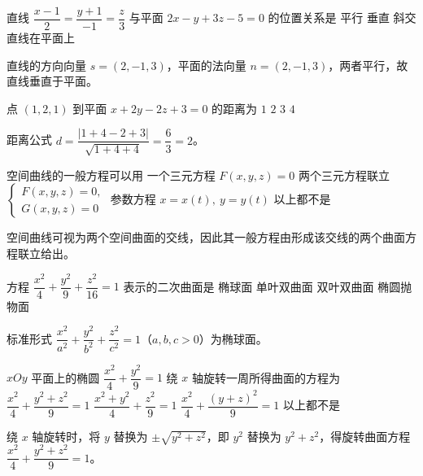 \documentclass[answer]{THUExam}
\begin{document}
\begin{problem}
直线 $\dfrac{x-1}{2}=\dfrac{y+1}{-1}=\dfrac{z}{3}$ 与平面 $2x-y+3z-5=0$ 的位置关系是
\options
{平行}
{垂直}
{斜交}
{直线在平面上}
\end{problem}
\begin{note}
直线的方向向量 $s=(2,-1,3)$，平面的法向量 $n=(2,-1,3)$，两者平行，故直线垂直于平面。
\end{note}
\bigskip

\begin{problem}
点 $(1,2,1)$ 到平面 $x+2y-2z+3=0$ 的距离为
\options
{$1$}
{$2$}
{$3$}
{$4$}
\end{problem}
\begin{note}
距离公式 $d=\dfrac{|1+4-2+3|}{\sqrt{1+4+4}}=\dfrac{6}{3}=2$。
\end{note}
\bigskip

\begin{problem}
空间曲线的一般方程可以用
\options
{一个三元方程 $F(x,y,z)=0$}
{两个三元方程联立 $\left\{\begin{array}{l}F(x,y,z)=0,\\ G(x,y,z)=0\end{array}\right.$}
{参数方程 $x=x(t),\ y=y(t)$}
{以上都不是}
\end{problem}
\begin{note}
空间曲线可视为两个空间曲面的交线，因此其一般方程由形成该交线的两个曲面方程联立给出。
\end{note}
\bigskip

\begin{problem}
方程 $\dfrac{x^2}{4}+\dfrac{y^2}{9}+\dfrac{z^2}{16}=1$ 表示的二次曲面是
\options
{椭球面}
{单叶双曲面}
{双叶双曲面}
{椭圆抛物面}
\end{problem}
\begin{note}
标准形式 $\dfrac{x^2}{a^2}+\dfrac{y^2}{b^2}+\dfrac{z^2}{c^2}=1$（$a,b,c>0$）为椭球面。
\end{note}
\bigskip

\begin{problem}
$xOy$ 平面上的椭圆 $\dfrac{x^2}{4}+\dfrac{y^2}{9}=1$ 绕 $x$ 轴旋转一周所得曲面的方程为
\options
{$\dfrac{x^2}{4}+\dfrac{y^2+z^2}{9}=1$}
{$\dfrac{x^2+y^2}{4}+\dfrac{z^2}{9}=1$}
{$\dfrac{x^2}{4}+\dfrac{(y+z)^2}{9}=1$}
{以上都不是}
\end{problem}
\begin{note}
绕 $x$ 轴旋转时，将 $y$ 替换为 $\pm\sqrt{y^2+z^2}$，即 $y^2$ 替换为 $y^2+z^2$，得旋转曲面方程 $\dfrac{x^2}{4}+\dfrac{y^2+z^2}{9}=1$。
\end{note}
\bigskip
\end{document}
